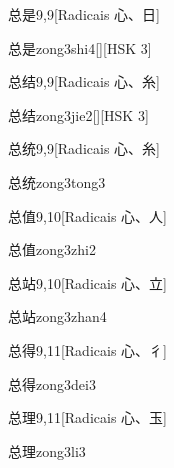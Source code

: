 \begin{entry}{总是}{9,9}[Radicais ⼼、⽇]
  \begin{phonetics}{总是}{zong3shi4}[][HSK 3]
  \end{phonetics}
\end{entry}

\begin{entry}{总结}{9,9}[Radicais ⼼、⽷]
  \begin{phonetics}{总结}{zong3jie2}[][HSK 3]
  \end{phonetics}
\end{entry}

\begin{entry}{总统}{9,9}[Radicais ⼼、⽷]
  \begin{phonetics}{总统}{zong3tong3}
  \end{phonetics}
\end{entry}

\begin{entry}{总值}{9,10}[Radicais ⼼、⼈]
  \begin{phonetics}{总值}{zong3zhi2}
  \end{phonetics}
\end{entry}

\begin{entry}{总站}{9,10}[Radicais ⼼、⽴]
  \begin{phonetics}{总站}{zong3zhan4}
  \end{phonetics}
\end{entry}

\begin{entry}{总得}{9,11}[Radicais ⼼、⼻]
  \begin{phonetics}{总得}{zong3dei3}
  \end{phonetics}
\end{entry}

\begin{entry}{总理}{9,11}[Radicais ⼼、⽟]
  \begin{phonetics}{总理}{zong3li3}
  \end{phonetics}
\end{entry}

